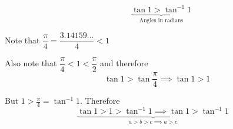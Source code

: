 \documentclass[14pt,fleqn]{extarticle}
\begin{document}
 

\begin{snippet}
    \correct
    
     \[ \qquad \underbrace{\tan 1 > \tan^{-1} 1}_{\text{Angles in radians}}  \]

    
    \reason
    
    Note that 
    $\dfrac\pi{4} = \dfrac{3.14159\ldots}{4} < 1$\newline 
    
    Also note that $\dfrac\pi{4} < 1 < \dfrac\pi{2}$ and therefore 
    \[ \quad \tan 1 > \tan\frac\pi{4} \implies \tan 1 > 1 \]
    
    But $1 > \frac\pi{4} = \tan^{-1} 1$. Therefore 
    \[ \underbrace{\tan 1 > 1 > \tan^{-1} 1 \implies \tan 1 > \tan^{-1} 1}_{a > b  > c \implies a > c} \]
    
\end{snippet} 
\end{document}
